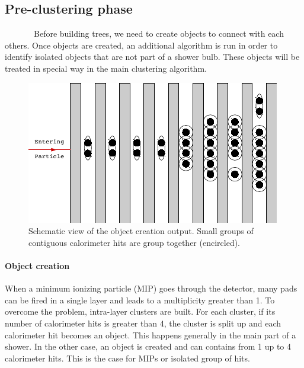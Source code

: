 \documentclass[cits]{JINST}
\begin{document}
\subsection{Pre-clustering phase} 

~~~~~~~Before building trees, we need to create objects to connect with each others. Once objects are created, an additional algorithm is run in order to identify isolated objects that are not part of a shower bulb. These objects will be treated in special way in the main clustering algorithm.

\begin{figure}
  \vspace{-20pt}
  \begin{center}
    \includegraphics[width=\linewidth]{ObjectCreationAfter.pdf}
  \end{center}
  \vspace{-10pt}
  \caption{\label{ARBOR_OBJECT_CREATION} Schematic view of the object creation output. Small groups of contiguous calorimeter hits are group together (encircled).}
  \vspace{-20pt}
\end{figure}

\paragraph*{Object creation} When a minimum ionizing particle (MIP) goes through the detector, many pads can be fired in a single layer and leads to a multiplicity greater than 1. To overcome the problem, intra-layer clusters are built. For each cluster, if its number of calorimeter hits is greater than 4, the cluster is split up and each calorimeter hit becomes an object. This happens generally in the main part of a shower. In the other case, an object is created and can contains from 1 up to 4 calorimeter hits. This is the case for MIPs or isolated group of hits. 
\end{document}
